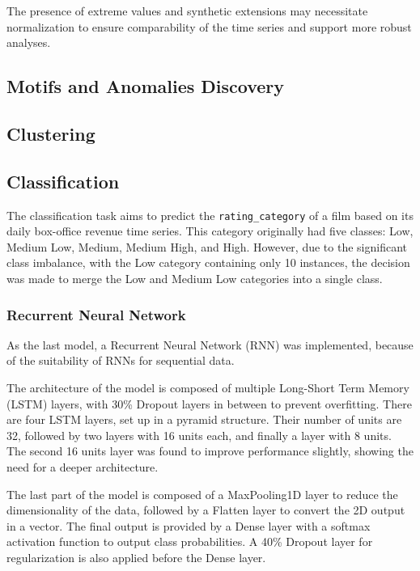 The presence of extreme values and synthetic extensions may necessitate normalization to ensure comparability 
of the time series and support more robust analyses.



\subsection{Motifs and Anomalies Discovery}



\subsection{Clustering}

\subsection{Classification}

The classification task aims to predict the \texttt{rating\_category} of a film based on its daily box-office revenue time series.
This category originally had five classes: Low, Medium Low, Medium, Medium High, and High.
However, due to the significant class imbalance, with the Low category containing only 10 instances,
the decision was made to merge the Low and Medium Low categories into a single class.


\subsubsection{Recurrent Neural Network}
As the last model, a Recurrent Neural Network (RNN) was implemented,
because of the suitability of RNNs for sequential data.

The architecture of the model is composed of multiple Long-Short Term Memory (LSTM)
layers, with 30\% Dropout layers in between to prevent overfitting.
There are four LSTM layers, set up in a pyramid structure.
Their number of units are 32, followed by two layers with 16 units each, and
finally a layer with 8 units. The second 16 units layer was found to improve
performance slightly, showing the need for a deeper architecture.

The last part of the model is composed of a MaxPooling1D layer to reduce the
dimensionality of the data, followed by a Flatten layer to convert the 2D output
in a vector. The final output is provided by a Dense layer with a softmax
activation function to output class probabilities.
A 40\% Dropout layer for regularization is also applied before the Dense layer.


